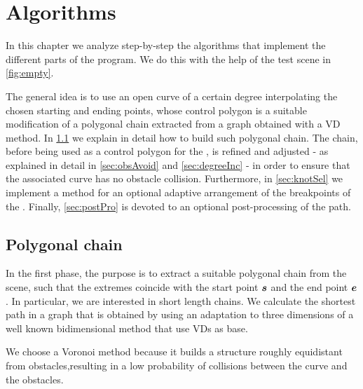 \documentclass[dissertation.tex]{subfiles}
\begin{document}
\chapter{Algorithms}\label{cha:algorithm}
In this chapter we analyze step-by-step the algorithms that implement
the different parts of the program. We do this with the help of the
test scene in \cref{fig:empty}.

The general idea is to use an open \bs curve of a certain degree
interpolating the chosen starting and ending points, whose
control polygon is a suitable modification of a polygonal chain
extracted from a graph
obtained with a \ac{VD} method. In \cref{sec:polChain} we
explain in detail how to
build such polygonal chain. The chain, before being used as a control
polygon for the \bs, is refined and adjusted - as explained in
detail in \cref{sec:obsAvoid} and \cref{sec:degreeInc} - in order to
ensure that the associated \bs curve has no obstacle
collision. Furthermore, in \cref{sec:knotSel} we implement a method
for an optional adaptive 
arrangement of the breakpoints of the \bs. Finally, \cref{sec:postPro}
is devoted to an optional post-processing of the path.

\section{Polygonal chain}\label{sec:polChain}
In the first phase, the purpose is to extract a suitable polygonal chain from
the scene, such that the extremes coincide with the start point $\boldsymbol{s}$
and the end point $\boldsymbol{e}$. In particular, we are interested in short length
chains. We calculate the shortest path
in a graph that is obtained by using an adaptation to three
dimensions of a well known bidimensional method
\cite{bhattacharya}\cite{ho-liu}\cite{seda-pich} that use
\acp{VD} as base.

We choose a Voronoi method because it builds a structure roughly
equidistant from obstacles,resulting in a low probability of
collisions between the curve and the obstacles.
\end{document}
